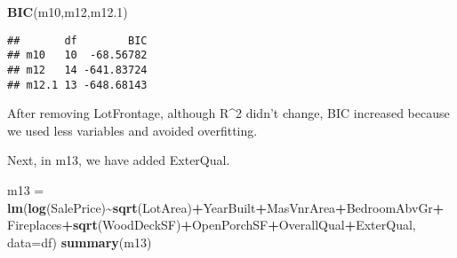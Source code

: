 \documentclass[
]{article}
\newenvironment{Shaded}{\begin{snugshade}}{\end{snugshade}}
\newcommand{\AttributeTok}[1]{\textcolor[rgb]{0.13,0.29,0.53}{#1}}
\newcommand{\FloatTok}[1]{\textcolor[rgb]{0.00,0.00,0.81}{#1}}
\newcommand{\FunctionTok}[1]{\textcolor[rgb]{0.13,0.29,0.53}{\textbf{#1}}}
\newcommand{\NormalTok}[1]{#1}
\newcommand{\OtherTok}[1]{\textcolor[rgb]{0.56,0.35,0.01}{#1}}
\newcommand{\SpecialCharTok}[1]{\textcolor[rgb]{0.81,0.36,0.00}{\textbf{#1}}}
\begin{document}
\begin{Shaded}
\begin{Highlighting}[]
\FunctionTok{BIC}\NormalTok{(m10,m12,m12}\FloatTok{.1}\NormalTok{)}
\end{Highlighting}
\end{Shaded}

\begin{verbatim}
##       df        BIC
## m10   10  -68.56782
## m12   14 -641.83724
## m12.1 13 -648.68143
\end{verbatim}

After removing LotFrontage, although R\^{}2 didn't change, BIC increased
because we used less variables and avoided overfitting.

Next, in m13, we have added ExterQual.

\begin{Shaded}
\begin{Highlighting}[]
\NormalTok{m13 }\OtherTok{=} \FunctionTok{lm}\NormalTok{(}\FunctionTok{log}\NormalTok{(SalePrice)}\SpecialCharTok{\textasciitilde{}}\FunctionTok{sqrt}\NormalTok{(LotArea)}\SpecialCharTok{+}\NormalTok{YearBuilt}\SpecialCharTok{+}\NormalTok{MasVnrArea}\SpecialCharTok{+}\NormalTok{BedroomAbvGr}\SpecialCharTok{+}
\NormalTok{           Fireplaces}\SpecialCharTok{+}\FunctionTok{sqrt}\NormalTok{(WoodDeckSF)}\SpecialCharTok{+}\NormalTok{OpenPorchSF}\SpecialCharTok{+}\NormalTok{OverallQual}\SpecialCharTok{+}\NormalTok{ExterQual, }\AttributeTok{data=}\NormalTok{df)}
\FunctionTok{summary}\NormalTok{(m13)}
\end{Highlighting}
\end{Shaded}
\end{document}
